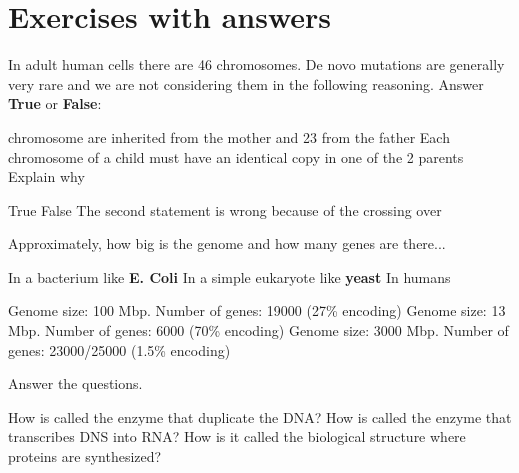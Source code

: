 \chapter{Exercises with answers}

\begin{Exercise} [
  title={Chromosomes},
  difficulty={1},
  label={ex1},
  origin={G. Valle}
 ]

  In adult human cells there are 46 chromosomes. De novo mutations are generally
very rare and we are not considering them in the following reasoning.
Answer \textbf{True} or \textbf{False}:

   chromosome are inherited from the mother and 23 from the father
  \Question Each chromosome of a child must have an identical copy in one of the
2 parents
  \subQuestion Explain why
\end{Exercise}

\begin{Answer} [
   ref={ex1},
   number={1}
 ]

  \Question True
  \Question False
  \subQuestion The second statement is wrong because of the crossing over

\end{Answer}


\begin{Exercise} [
  title={Genomes and genes},
  difficulty={1},
  label={ex2},
  origin={G. Valle}
 ]

  Approximately, how big is the genome and how many genes are there...

  \Question In a bacterium like \textbf{E. Coli}
  \Question In a simple eukaryote like \textbf{yeast}
  \Question In humans

\end{Exercise}

\begin{Answer} [
  ref={ex2},
  number={2}
 ]

  \Question Genome size: 100 Mbp. Number of genes: 19000 (27\% encoding)
  \Question Genome size: 13 Mbp. Number of genes: 6000 (70\% encoding)
  \Question Genome size: 3000 Mbp. Number of genes: 23000/25000 (1.5\% encoding)

\end{Answer}

\begin{Exercise} [
  title={Enzyme},
  difficulty={1},
  label={ex3},
  origin={G. Valle}
 ]

  Answer the questions.

  \Question How is called the enzyme that duplicate the DNA?
  \Question How is called the enzyme that transcribes DNS into RNA?
  \Question How is it called the biological structure where proteins are
synthesized?
\end{Exercise}

